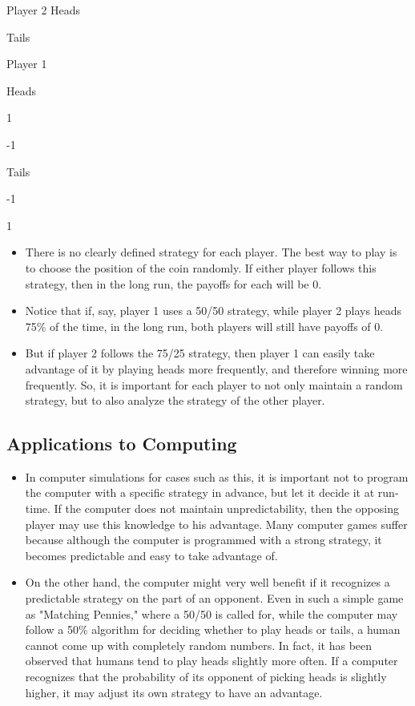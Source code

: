\documentclass[]{report}
\begin{document}
Player 2
Heads

Tails

Player 1  

Heads

1

-1

Tails

-1

1

\begin{itemize}
\item There is no clearly defined strategy for each player. The best way to play is to choose the position of the coin randomly. If either player follows this strategy, then in the long run, the payoffs for each will be 0. 
\item Notice that if, say, player 1 uses a 50/50 strategy, while player 2 plays heads 75\% of the time, in the long run, both players will still have payoffs of 0.
\item  But if player 2 follows the 75/25 strategy, then player 1 can easily take advantage of it by playing heads more frequently, and therefore winning more frequently. So, it is important for each player to not only maintain a random strategy, but to also analyze the strategy of the other player.
\end{itemize}
\subsection{Applications to Computing}
\begin{itemize}
\item In computer simulations for cases such as this, it is important not to program the computer with a specific strategy in advance, but let it decide it at run-time. If the computer does not maintain unpredictability, then the opposing player may use this knowledge to his advantage. Many computer games suffer because although the computer is programmed with a strong strategy, it becomes predictable and easy to take advantage of.
\item 
On the other hand, the computer might very well benefit if it recognizes a predictable strategy on the part of an opponent. Even in such a simple game as "Matching Pennies," where a 50/50 is called for, while the computer may follow a 50\% algorithm for deciding whether to play heads or tails, a human cannot come up with completely random numbers. In fact, it has been observed that humans tend to play heads slightly more often. If a computer recognizes that the probability of its opponent of picking heads is slightly higher, it may adjust its own strategy to have an advantage.
\end{itemize}
\end{document}
